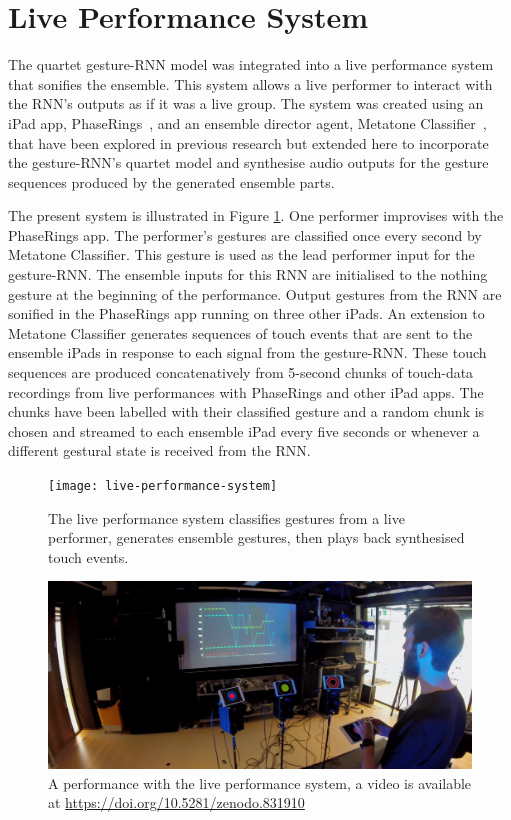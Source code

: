 \documentclass[sigchi]{acmart} %
\begin{document}
\section{Live Performance System}

The quartet gesture-RNN model was integrated into a live performance
system that sonifies the ensemble. This system allows a live performer
to interact with the RNN's outputs as if it was a live group.
The system was created using an iPad app,
PhaseRings~\cite{Martin:2016ah}, and an ensemble director agent,
Metatone Classifier~\cite{Martin:2016xu}, that have been explored in
previous research but extended here to incorporate the gesture-RNN's
quartet model and synthesise audio outputs for the gesture sequences
produced by the generated ensemble parts.

The present system is illustrated in Figure
\ref{fig:live-performance-system}. One performer improvises with the
PhaseRings app. The performer's gestures are classified once every
second by Metatone Classifier. This gesture is used as the lead
performer input for the gesture-RNN. The ensemble inputs for this RNN
are initialised to the nothing gesture at the beginning of the
performance. Output gestures from the RNN are sonified in the
PhaseRings app running on three other iPads. An extension to Metatone
Classifier generates sequences of touch events that are sent to the
ensemble iPads in response to each signal from the gesture-RNN. These
touch sequences are produced concatenatively from 5-second chunks of
touch-data recordings from live performances with PhaseRings and other
iPad apps. The chunks have been labelled with their classified gesture
and a random chunk is chosen and streamed to each ensemble iPad every
five seconds or whenever a different gestural state is received from
the RNN.

\begin{figure}
  \centering
  \texttt{[image: live-performance-system]}
  \caption{The live performance system classifies gestures from a live
  performer, generates ensemble gestures, then plays back synthesised
  touch events.}\label{fig:live-performance-system}
\end{figure}

\begin{figure}
  \centering
  \includegraphics[width=\columnwidth]{neural-ipad-band-demo.jpg}
  \caption{A performance with the live performance system, a video is
    available at
    \url{https://doi.org/10.5281/zenodo.831910}}\label{fig:live-system-demo}
\end{figure}
\end{document}
